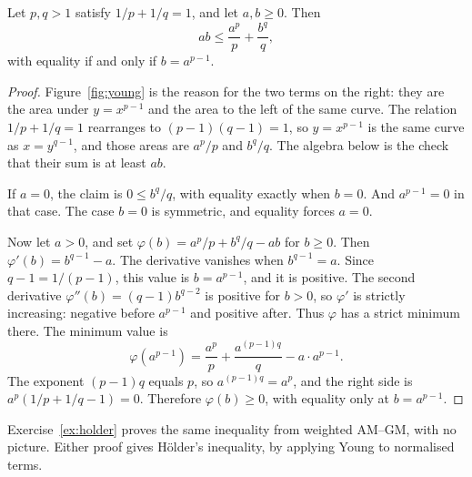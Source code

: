 \begin{theorem}[Young]\label{thm:young}
Let $p,q>1$ satisfy $1/p+1/q=1$, and let $a,b\ge0$. Then
\[
ab\le\frac{a^p}p+\frac{b^q}q,
\]
with equality if and only if $b=a^{p-1}$.
\end{theorem}
\begin{proof}
Figure~\ref{fig:young} is the reason for the two terms on the right: they are the area under $y=x^{p-1}$ and the area to the left of the same curve. The relation $1/p+1/q=1$ rearranges to $(p-1)(q-1)=1$, so $y=x^{p-1}$ is the same curve as $x=y^{q-1}$, and those areas are $a^p/p$ and $b^q/q$. The algebra below is the check that their sum is at least $ab$.

If $a=0$, the claim is $0\le b^q/q$, with equality exactly when $b=0$. And $a^{p-1}=0$ in that case. The case $b=0$ is symmetric, and equality forces $a=0$.

Now let $a>0$, and set $\varphi(b)=a^p/p+b^q/q-ab$ for $b\ge0$. Then $\varphi'(b)=b^{q-1}-a$. The derivative vanishes when $b^{q-1}=a$. Since $q-1=1/(p-1)$, this value is $b=a^{p-1}$, and it is positive. The second derivative $\varphi''(b)=(q-1)b^{q-2}$ is positive for $b>0$, so $\varphi'$ is strictly increasing: negative before $a^{p-1}$ and positive after. Thus $\varphi$ has a strict minimum there. The minimum value is
\[
\varphi(a^{p-1})=\frac{a^p}p+\frac{a^{(p-1)q}}q-a\cdot a^{p-1}.
\]
The exponent $(p-1)q$ equals $p$, so $a^{(p-1)q}=a^p$, and the right side is $a^p(1/p+1/q-1)=0$. Therefore $\varphi(b)\ge0$, with equality only at $b=a^{p-1}$.
\end{proof}

Exercise~\ref{ex:holder} proves the same inequality from weighted AM--GM, with no picture. Either proof gives H\"older's inequality, by applying Young to normalised terms.

